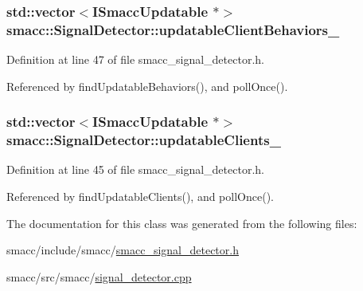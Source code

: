 \subsubsection[{\texorpdfstring{updatable\+Client\+Behaviors\+\_\+}{updatableClientBehaviors_}}]{\setlength{\rightskip}{0pt plus 5cm}std\+::vector$<${\bf I\+Smacc\+Updatable} $\ast$$>$ smacc\+::\+Signal\+Detector\+::updatable\+Client\+Behaviors\+\_\+\hspace{0.3cm}{\ttfamily [private]}}\hypertarget{classsmacc_1_1SignalDetector_a9dce129da8c8a9971416a8f498132c23}{}\label{classsmacc_1_1SignalDetector_a9dce129da8c8a9971416a8f498132c23}


Definition at line 47 of file smacc\+\_\+signal\+\_\+detector.\+h.



Referenced by find\+Updatable\+Behaviors(), and poll\+Once().

\subsubsection[{\texorpdfstring{updatable\+Clients\+\_\+}{updatableClients_}}]{\setlength{\rightskip}{0pt plus 5cm}std\+::vector$<${\bf I\+Smacc\+Updatable} $\ast$$>$ smacc\+::\+Signal\+Detector\+::updatable\+Clients\+\_\+\hspace{0.3cm}{\ttfamily [private]}}\hypertarget{classsmacc_1_1SignalDetector_a01a457b4ec935473d6426efb7b87e683}{}\label{classsmacc_1_1SignalDetector_a01a457b4ec935473d6426efb7b87e683}


Definition at line 45 of file smacc\+\_\+signal\+\_\+detector.\+h.



Referenced by find\+Updatable\+Clients(), and poll\+Once().



The documentation for this class was generated from the following files\+:\begin{DoxyCompactItemize}
\item 
smacc/include/smacc/\hyperlink{smacc__signal__detector_8h}{smacc\+\_\+signal\+\_\+detector.\+h}\item 
smacc/src/smacc/\hyperlink{signal__detector_8cpp}{signal\+\_\+detector.\+cpp}\end{DoxyCompactItemize}
